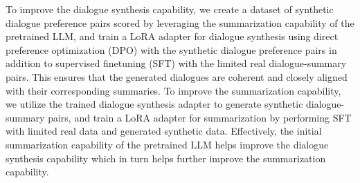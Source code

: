 To improve the dialogue synthesis capability, we create a dataset of synthetic dialogue preference pairs scored by leveraging the summarization capability of the pretrained LLM, and train a LoRA \citep{hu2022lora} adapter for dialogue synthesis using direct preference optimization (DPO) with the synthetic dialogue preference pairs in addition to supervised finetuning (SFT) with the limited real dialogue-summary pairs. This ensures that the generated dialogues are coherent and closely aligned with their corresponding summaries. To improve the summarization capability, we utilize the trained dialogue synthesis adapter to generate synthetic dialogue-summary pairs, and train a LoRA adapter for summarization by performing SFT with limited real data and generated synthetic data. Effectively, the initial summarization capability of the pretrained LLM helps improve the dialogue synthesis capability which in turn helps further improve the summarization capability.





